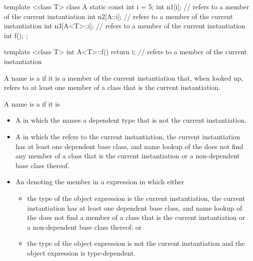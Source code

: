 \begin{example}
\begin{codeblock}
template <class T> class A {
  static const int i = 5;
  int n1[i];                    //  refers to a member of the current instantiation
  int n2[A::i];                 //  refers to a member of the current instantiation
  int n3[A<T>::i];              //  refers to a member of the current instantiation
  int f();
};

template <class T> int A<T>::f() {
  return i;                     //  refers to a member of the current instantiation
}
\end{codeblock}
\end{example}

%
A name is a  if it is a
member of the current instantiation that, when looked up, refers to at least
one member of a class that is the current instantiation.

\pnum
A name is a
if it is

\begin{itemize}
\item
A
in which the
names a dependent type that is not the current instantiation.

\item A  in which the 
refers to the current instantiation, the current instantiation has at least one
dependent base class, and name lookup of the  does not
find any member of a class that is the current instantiation or a non-dependent
base class thereof.

\item An  denoting the member in a
 expression in which either
\begin{itemize}
\item the type of the object expression is the current instantiation, the
current instantiation has at least one dependent base class, and name lookup
of the  does not find a member of a class that is
the current instantiation or a non-dependent base class thereof; or

\item the type of the object expression is not the current instantiation
and the object expression is type-dependent.
\end{itemize}
\end{itemize}

